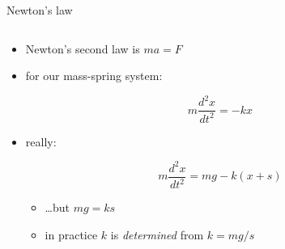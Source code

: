 \documentclass{beamer}
\begin{document}
\begin{frame}{Newton's law}

\begin{columns}
\begin{column}{0.65\textwidth}
\begin{itemize}
\item Newton's second law is $ma=F$
\item for our mass-spring system:

\vspace{-3mm}
    $$m \frac{d^2x}{dt^2} = - k x$$

\vspace{-2mm}
\item really:

\vspace{-2mm}
        $$m \frac{d^2x}{dt^2} = mg - k (x+s)$$

\vspace{-2mm}
    \begin{itemize}
    \item \dots but $mg=ks$
    \item in practice $k$ is \emph{determined} from $k=mg/s$
    \end{itemize}

\vspace{3mm}


\end{itemize}
\end{column}
\end{columns}
\end{frame}
\end{document}
